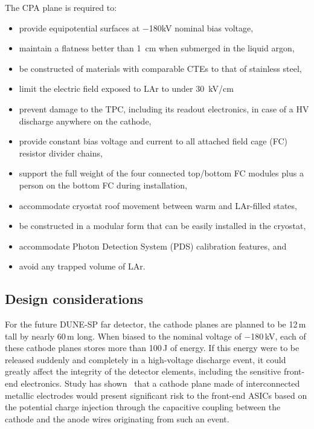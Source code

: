 The CPA plane is required to:
\begin{itemize}
\item provide equipotential surfaces at $-$180kV nominal bias voltage,
\item maintain a flatness better than 1~cm when submerged in the liquid argon,
\item be constructed of materials with comparable CTEs to that of stainless steel, 
\item limit the electric field exposed to LAr to under 30~kV/cm 
\item prevent damage to the TPC, including its readout electronics, in case of a HV discharge anywhere on the cathode,
\item provide constant bias voltage and current to all attached field cage (FC) resistor divider chains,
\item support the full weight of the four connected top/bottom FC modules plus a person on the bottom FC during installation,
\item accommodate cryostat roof movement between warm and LAr-filled states,
\item be constructed in a modular form that can be easily installed in the cryostat,
\item accommodate Photon Detection System (PDS) calibration features, and
\item avoid any trapped volume of LAr.
\end{itemize}

\subsection{Design considerations}


For the future DUNE-SP far detector, the cathode planes are planned to be 12\,m tall by nearly 60\,m long.  When biased to the nominal voltage of $-$180\,kV, each of these cathode planes stores more than 100\,J of energy. If this energy were to be released  suddenly and completely in a high-voltage discharge event, it could greatly affect the integrity of the detector elements, including the sensitive front-end electronics.  
Study has shown~\cite{cathode-hv-1320} that a cathode plane made of interconnected metallic electrodes would present significant risk to the front-end ASICs based on the potential charge injection through the capacitive coupling between the cathode and the anode wires originating from such an event.  

